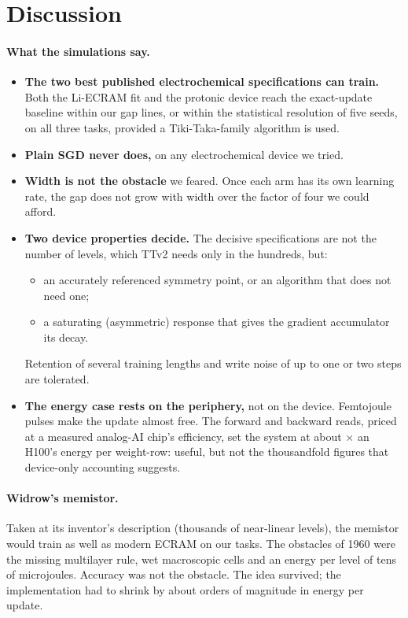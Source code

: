 \section{Discussion}\label{sec:discussion}
\paragraph{What the simulations say.}
\begin{itemize}
\item \textbf{The two best published electrochemical specifications can train.} Both the Li-ECRAM fit and the protonic device
      reach the exact-update baseline within our gap lines, or within the statistical resolution of five seeds, on all three
      tasks, provided a Tiki-Taka-family algorithm is used.
\item \textbf{Plain SGD never does,} on any electrochemical device we tried.
\item \textbf{Width is not the obstacle} we feared. Once each arm has its own learning rate, the gap does not grow with width
      over the factor of four we could afford.
\item \textbf{Two device properties decide.} The decisive specifications are not the number of levels, which TTv2 needs only in
      the hundreds, but:
      \begin{itemize}
      \item an accurately referenced symmetry point, or an algorithm that does not need one;
      \item a saturating (asymmetric) response that gives the gradient accumulator its decay.
      \end{itemize}
      Retention of several training lengths and write noise of up to one or two steps are tolerated.
\item \textbf{The energy case rests on the periphery,} not on the device. Femtojoule pulses make the update almost free. The
      forward and backward reads, priced at a measured analog-AI chip's efficiency, set the system at about
      \REnRatioMin$\times$ an H100's energy per weight-row: useful, but not the thousandfold figures that device-only accounting
      suggests.
\end{itemize}

\paragraph{Widrow's memistor.} Taken at its inventor's description (thousands of near-linear levels), the memistor would train
as well as modern ECRAM on our tasks. The obstacles of 1960 were the missing multilayer rule, wet macroscopic cells and an
energy per level of tens of microjoules. Accuracy was not the obstacle. The idea survived; the implementation had to shrink by
about \ROrdersWidrowVsProtonic{} orders of magnitude in energy per update.

